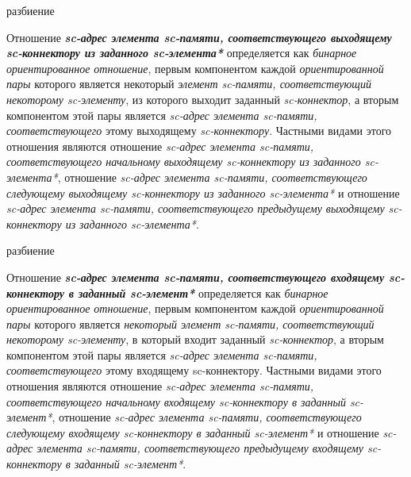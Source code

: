\begin{SCn}
\begin{scnrelfromset}{разбиение}
\end{scnrelfromset}
\end{SCn}

Отношение \textbf{\textit{sc-адрес элемента sc-памяти, соответствующего выходящему sc-коннектору из заданного sc-элемента*}} определяется как \textit{бинарное ориентированное отношение}, первым компонентом каждой \textit{ориентированной пары} которого является некоторый \textit{элемент sc-памяти, соответствующий некоторому sc-элементу}, из которого выходит заданный \textit{sc-коннектор}, а вторым компонентом этой пары является \textit{sc-адрес элемента sc-памяти, соответствующего} этому выходящему \textit{sc-коннектору}. Частными видами этого отношения являются отношение \textit{sc-адрес элемента sc-памяти, соответствующего начальному выходящему sc-коннектору из заданного sc-элемента*}, отношение \textit{sc-адрес элемента sc-памяти, соответствующего следующему выходящему sc-коннектору из заданного sc-элемента*} и отношение \textit{sc-адрес элемента sc-памяти, соответствующего предыдущему выходящему sc-коннектору из заданного sc-элемента*}.

\begin{SCn}
\begin{scnrelfromset}{разбиение}
\end{scnrelfromset}
\end{SCn}

Отношение \textbf{\textit{sc-адрес элемента sc-памяти, соответствующего входящему sc-коннектору в заданный sc-элемент*}} определяется как \textit{бинарное ориентированное отношение}, первым компонентом каждой \textit{ориентированной пары} которого является \textit{некоторый элемент sc-памяти, соответствующий некоторому sc-элементу}, в который входит заданный \textit{sc-коннектор}, а вторым компонентом этой пары является \textit{sc-адрес элемента sc-памяти, соответствующего} этому входящему {sc-коннектору}. Частными видами этого отношения являются отношение \textit{sc-адрес элемента sc-памяти, соответствующего начальному входящему sc-коннектору в заданный sc-элемент*}, отношение \textit{sc-адрес элемента sc-памяти, соответствующего следующему входящему sc-коннектору в заданный sc-элемент*} и отношение \textit{sc-адрес элемента sc-памяти, соответствующего предыдущему входящему sc-коннектору в заданный sc-элемент*}.

